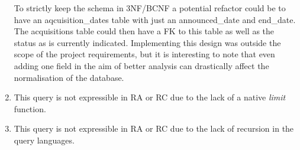 \documentclass[12pt]{article}
\begin{document}
\begin{enumerate}
To strictly keep the schema in 3NF/BCNF a potential refactor could be to have an aqcuisition\_dates table with just an announced\_date and end\_date. The acquisitions table could then have a FK to this table as well as the status as is currently indicated. Implementing this design was outside the scope of the project requirements, but it is interesting to note that even adding one field in the aim of better analysis can drastically affect the normalisation of the database.

  \item\label{part1} This query is not expressible in RA or RC due to the lack of a native \emph{limit} function.
  \item\label{part1} This query is not expressible in RA or RC due to the lack of recursion in the query languages.
  \end{enumerate}
\end{document}
